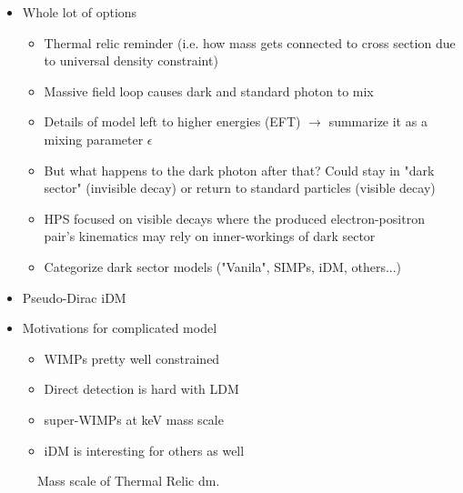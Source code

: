 \begin{itemize}
      \item Whole lot of options
            \begin{itemize}
                  \item Thermal relic reminder (i.e. how mass gets connected to cross section due to universal density constraint) \cite{thermal-freezeout-diagram-1996}
                  \item Massive field loop causes dark and standard photon to mix
                  \item Details of model left to higher energies (EFT) $\rightarrow$ summarize it as a mixing parameter $\epsilon$ \cite{kinetic-mixing-1986}
                  \item But what happens to the dark photon after that? Could stay in "dark sector" (invisible decay) or return to standard particles (visible decay)
                  \item HPS focused on visible decays where the produced electron-positron pair's kinematics may rely on inner-workings of dark sector
                  \item Categorize dark sector models ("Vanila", SIMPs, iDM, others...)
            \end{itemize}
      \item Pseudo-Dirac iDM
      \item Motivations for complicated model
            \begin{itemize}
                  \item WIMPs pretty well constrained \cite{supercdms-2018,damic-2020,xenon1t-2018}
                  \item Direct detection is hard with LDM \cite{ldmconstraints-2019}
                  \item super-WIMPs at keV mass scale \cite{superwimps-2008}
                  \item iDM is interesting for others as well \cite{darkseaquest-2018}
            \end{itemize}
\end{itemize}

\begin{figure}
      \centering
      
      \caption{Mass scale of Thermal Relic \gls{dm}.}
      \label{fig:dm-mass-scale}
\end{figure}
